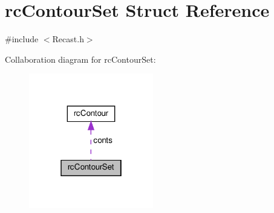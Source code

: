 \hypertarget{structrcContourSet}{}\section{rc\+Contour\+Set Struct Reference}
\label{structrcContourSet}


{\ttfamily \#include $<$Recast.\+h$>$}



Collaboration diagram for rc\+Contour\+Set\+:
\nopagebreak
\begin{figure}[H]
\begin{center}
\leavevmode
\includegraphics[width=154pt]{structrcContourSet__coll__graph}
\end{center}
\end{figure}
